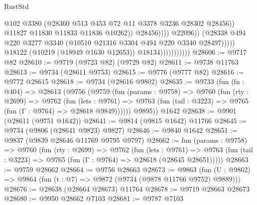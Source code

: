 \begin{lexlean}{RustStd}
\begin{coremodule}
                                                  @102
                                                  @3380
                                                  (@28360
                                                    @513
                                                    @453
                                                    @72
                                                    @11
                                                    @3378
                                                    @3236
                                                    @28302
                                                    @28456))
                                                @11827
                                                @11830
                                                @11833
                                                @11836
                                                @10262))
                                            @28456))))
                                    @22096))
                                (@28338
                                  @494
                                  @220
                                  @3277
                                  @3340
                                  (@10510 @21316 @3304 @494 @220 @3340 @28497)))))
                          @18122
                          (@10219 (@18949 @1630 @12653))
                          @18134)))))))))))
@28606 := @9717 @82
@28610 := @9719 (@9723 @82) (@9729 @82)
@28611 := @9738 @11763
@28613 := @9734 (@28611 @9753)
@28615 := @9776 (@9777 @82)
@28616 := @9772 @28615
@28618 := @9734 (@28616 @9802)
@28635 := @9733
    (fun (fn : @404) =>
    @28613
      (@9756
        (@9759
          (fun (params : @9758) =>
          @9760
            (fun (rty : @2699) =>
            @9762
              (fun (lets : @9761) =>
              @9763 (fun (tail : @3223) => @9765 (fun (Γ : @9764) => @28618 @9849))))))
        @9895))
    @1642
@28638 := @9901 (@28611 (@9751 @1642))
@28641 := @9814 (@9815 @1642) @11766
@28645 := @9734 (@9806 (@28641 @9823) @9827)
@28646 := @9840 @1642
@28651 := @9837 (@9839 @28646 @11769 @9795 @9797)
@28662 := fun (params : @9758) =>
  @9760
    (fun (rty : @2699) =>
    @9762
      (fun (lets : @9761) =>
      @9763 (fun (tail : @3223) => @9765 (fun (Γ : @9764) => @28618 (@28645 @28651)))))
@28663 := @9759 @28662
@28664 := @9756 @28663
@28673 := @9863
    (fun (U : @9862) => @9864 (fun (t : @7) => @9872 (@9734 (@9878 @11766 @9752) @9889)))
@28676 := @28638 (@28664 @28673) @11764
@28678 := @9719 @28663 @28673
@28680 := @9950 @28662 @7103
@28681 := @9787 @7103

\end{coremodule}
\end{lexlean}
